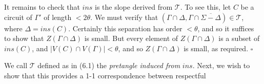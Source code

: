 It remains to check that $ins$ is the slope derived from $\mathscr{T}$. To see this, let $C$ be a circuit of $\Gamma'$ of length $< 2\theta$. We must verify that $(\Gamma \cap \Delta, \Gamma \cap \overline{\Sigma - \Delta}) \in \mathscr{T}$, where $\Delta = ins(C)$. Certainly this separation has order $< \theta$, and so it suffices to show that $Z(\Gamma \cap \Delta)$ is small. But every element of $Z(\Gamma \cap \Delta)$ is a subset of $ins(C)$, and $|V(C) \cap V(\Gamma)| < \theta$, and so $Z(\Gamma \cap \Delta)$ is small, as required. $\square$

We call $\mathscr{T}$ defined as in (6.1) the \textit{pretangle induced from} $ins$. Next, we wish to show that this provides a 1-1 correspondence between respectful

